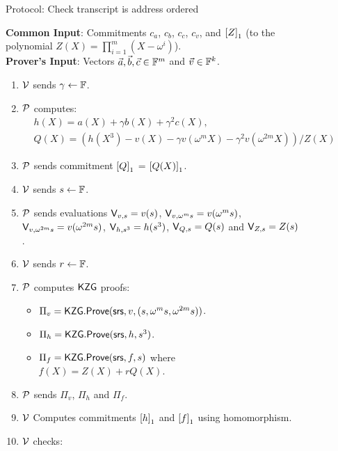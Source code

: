 \begin{figure}[htbp]
    \caption{Protocol: Check transcript is address ordered}
    \label{fig:encoded-relations}
\end{figure}

\begin{figure}[htbp]
    \begin{mdframed}
    {
            {\bf Common Input}: Commitments $c_a$, $c_b$, $c_c$, $c_v$, and $\gone{Z}$ (to the polynomial
        $Z(X)=\prod_{i=1}^m (X-\omega^i)$). \\
    {\bf Prover's Input}: Vectors $\vec{a},\vec{b},\vec{c}\in\F^m$ and $\vec{v}\in \F^k$.
        \begin{enumerate}[leftmargin=1em, label=\arabic*.]
            \item $\verifier$ sends $\gamma\gets \F$.
            \item $\prover$ computes:
            \begin{align}
                & h(X) = a(X) + \gamma b(X) + \gamma^2 c(X),\\
                & Q(X) = (h(X^3) - v(X) - \gamma v(\omega^m X) - \gamma^2 v(\omega^{2m} X))/Z(X)
            \end{align}
            \item $\prover$ sends commitment $\gone{Q}$ = $\gone{Q(X)}$.
            \item $\verifier$ sends $s\gets\F$.
            \item $\prover$ sends evaluations $\val{s}{v}=v(s)$, $\val{\omega^m s}{v}=v(\omega^m s)$,
            $\val{\omega^{2m}s}{v}=v(\omega^{2m} s)$, $\val{s^3}{h}=h(s^3)$, $\val{s}{Q}=Q(s)$ and $\val{s}{Z}=Z(s)$.
            \item $\verifier$ sends $r\gets\F$.
            \item $\prover$ computes $\kzg$ proofs:
            \begin{itemize}[leftmargin=1em]
                \item $\Pi_v=\kzgprove(\srs,v,(s,\omega^m s, \omega^{2m}s))$.
                \item $\Pi_h=\kzgprove(\srs,h,s^3)$.
                \item $\Pi_f=\kzgprove(\srs,f,s)$ where $f(X)=Z(X) + rQ(X)$.
            \end{itemize}
            \item $\prover$ sends $\Pi_v$, $\Pi_h$ and $\Pi_f$.
            \item $\verifier$ Computes commitments $\gone{h}$ and $\gone{f}$ using homomorphism.
            \item $\verifier$ checks:

\end{enumerate}}
\end{mdframed}
\end{figure}
